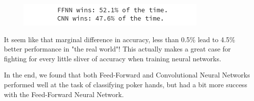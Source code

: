 \documentclass[11pt]{article}
\makeatletter
\def\maxwidth{\ifdim\Gin@nat@width>\linewidth\linewidth
    \else\Gin@nat@width\fi}
\let\Oldincludegraphics\includegraphics
\renewcommand{\includegraphics}[1]{\Oldincludegraphics[width=.8\maxwidth]{#1}}
\makeatother
\begin{document}
    \begin{figure}[htbp]
\centering
\includegraphics{net_v_net.png}
\caption{}
\end{figure}

    It seem like that marginal difference in accuracy, less than 0.5\% lead
to 4.5\% better performance in "the real world"! This actually makes a
great case for fighting for every little sliver of accuracy when
training neural networks.

In the end, we found that both Feed-Forward and Convolutional Neural
Networks performed well at the task of classifying poker hands, but had
a bit more success with the Feed-Forward Neural Network.


    
    
    
    
\end{document}
